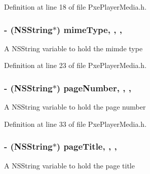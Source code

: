Definition at line 18 of file Pxe\-Player\-Media.\-h.

\hypertarget{interface_pxe_player_media_a4545ba2ae21c08b68a120c469f9bcbdd}{
\subsubsection[{mime\-Type}]{\setlength{\rightskip}{0pt plus 5cm}-\/ (N\-S\-String$\ast$) mime\-Type\hspace{0.3cm}{\ttfamily [read]}, {\ttfamily [write]}, {\ttfamily [nonatomic]}, {\ttfamily [strong]}}}\label{interface_pxe_player_media_a4545ba2ae21c08b68a120c469f9bcbdd}
A N\-S\-String variable to hold the mimde type 

Definition at line 23 of file Pxe\-Player\-Media.\-h.

\hypertarget{interface_pxe_player_media_aede96584e0b5b76d805532fe2c1f9a11}{
\subsubsection[{page\-Number}]{\setlength{\rightskip}{0pt plus 5cm}-\/ (N\-S\-String$\ast$) page\-Number\hspace{0.3cm}{\ttfamily [read]}, {\ttfamily [write]}, {\ttfamily [nonatomic]}, {\ttfamily [strong]}}}\label{interface_pxe_player_media_aede96584e0b5b76d805532fe2c1f9a11}
A N\-S\-String variable to hold the page number 

Definition at line 33 of file Pxe\-Player\-Media.\-h.

\hypertarget{interface_pxe_player_media_acff05c6eaa894aeb7c9226eddce9b1da}{
\subsubsection[{page\-Title}]{\setlength{\rightskip}{0pt plus 5cm}-\/ (N\-S\-String$\ast$) page\-Title\hspace{0.3cm}{\ttfamily [read]}, {\ttfamily [write]}, {\ttfamily [nonatomic]}, {\ttfamily [strong]}}}\label{interface_pxe_player_media_acff05c6eaa894aeb7c9226eddce9b1da}
A N\-S\-String variable to hold the page title 

